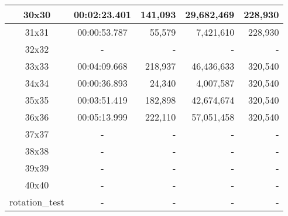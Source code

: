 \begin{center}
\begin{tabular}{|c|c|r|r|r|}
		30x30 & 00:02:23.401 & 141,093 & 29,682,469 & 228,930 \\ \hline
		31x31 & 00:00:53.787 & 55,579 & 7,421,610 & 228,930 \\ \hline
		32x32 & - & - & - & - \\ \hline
		33x33 & 00:04:09.668 & 218,937 & 46,436,633 & 320,540 \\ \hline
		34x34 & 00:00:36.893 & 24,340 & 4,007,587 & 320,540 \\ \hline
		35x35 & 00:03:51.419 & 182,898 & 42,674,674 & 320,540 \\ \hline
		36x36 & 00:05:13.999 & 222,110 & 57,051,458 & 320,540 \\ \hline
		37x37 & - & - & - & - \\ \hline
		38x38 & - & - & - & - \\ \hline
		39x39 & - & - & - & - \\ \hline
		40x40 & - & - & - & - \\ \hline
		rotation\_test & - & - & - & - \\ \hline

    \end{tabular}
\end{center}
